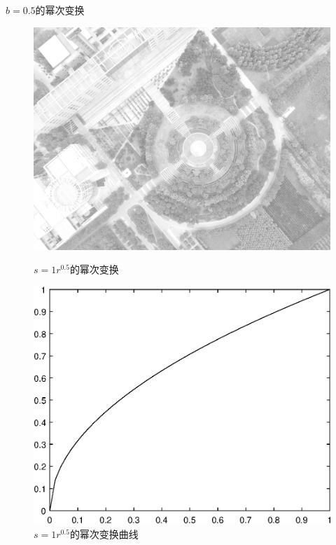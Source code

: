$b=0.5$的幂次变换
\begin{figure}[H]
	\centering
	\begin{minipage}{0.45\linewidth}
		\includegraphics[width=\linewidth]{figure/DJI_0027_Gamma_50.png}
		\caption{$s=1r^0.5$的幂次变换}
	\end{minipage}
	\begin{minipage}{0.45\linewidth}
		\includegraphics[width=\linewidth]{figure/DJI_0027_Gamma_50_Graph.eps}
		\caption{$s=1r^{0.5}$的幂次变换曲线}
	\end{minipage}
\end{figure}

